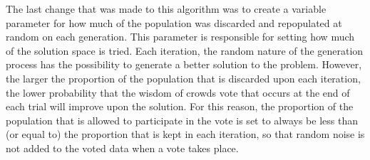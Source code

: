 The last change that was made to this algorithm was to create a variable parameter for how much of the population was discarded and repopulated at random  on each generation. This parameter is responsible for setting how much of the solution space is tried. Each iteration, the random nature of the generation process has the possibility to generate a better solution to the problem. However, the larger the proportion of the population that is discarded upon each iteration, the lower probability that the wisdom of crowds vote that occurs at the end of each trial will improve upon the solution. For this reason, the proportion of the population that is allowed to participate in the vote is set to always be less than (or equal to) the proportion that is kept in each iteration, so that random noise is not added to the voted data when a vote takes place.